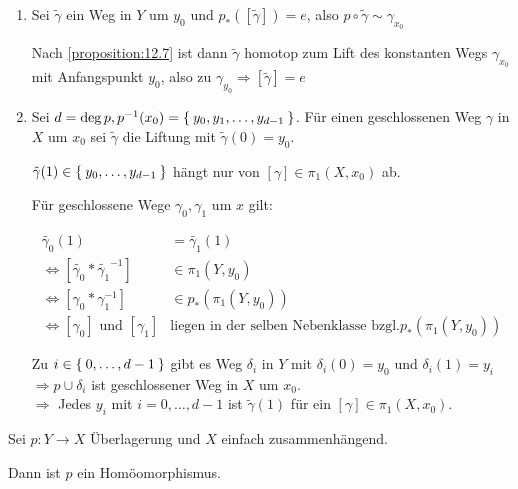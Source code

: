 \begin{beweis}\leavevmode
    \begin{enumerate}[label=\alph*)]
        \item Sei $\tilde{\gamma}$ ein Weg in $Y$ um $y_0$ und
              $p_* ([\tilde{\gamma}]) = e$, also $p \circ \tilde{\gamma} \sim \gamma_{x_0}$

              Nach \cref{proposition:12.7} ist dann 
              $\tilde{\gamma}$ homotop zum Lift des konstanten Wegs
              $\gamma_{x_0}$ mit Anfangspunkt $y_0$, also zu
              $\gamma_{y_0} \Rightarrow [\tilde{\gamma}] = e$
        \item Sei $d = \deg{p}, p^{-1}(x_0) = \Set{y_0, y_1, \dots, y_{d-1}}$.
              Für einen geschlossenen Weg $\gamma$ in $X$ um $x_0$
              sei $\tilde{\gamma}$ die Liftung mit $\tilde{\gamma}(0) = y_0$.

              $\tilde{\gamma}(1) \in \Set{y_0, \dots, y_{d-1}}$ hängt
              nur von $[\gamma] \in \pi_1(X,x_0)$ ab.

              Für geschlossene Wege $\gamma_0, \gamma_1$ um $x$ gilt:

              \begin{align*}
                \tilde{\gamma_0}(1) &= \tilde{\gamma_1}(1)\\
                \Leftrightarrow [\tilde{\gamma_0} * \tilde{\gamma_1}^{-1}] &\in \pi_1(Y, y_0)\\
                \Leftrightarrow [\gamma_0 * \gamma_1^{-1}] &\in p_* (\pi_1(Y,y_0))\\
                \Leftrightarrow [\gamma_0] \text{ und } [\gamma_1] &\text{liegen in der selben Nebenklasse bzgl.} p_*(\pi_1(Y, y_0))
              \end{align*}

              Zu $i \in \Set{0, \dots, d-1}$ gibt es Weg $\delta_i$ in
              $Y$ mit $\delta_i(0) = y_0$ und $\delta_i(1) = y_i$\\
              $\Rightarrow p \cup \delta_i$ ist geschlossener Weg in 
              $X$ um $x_0$.\\
              $\Rightarrow$ Jedes $y_i$ mit $i=0, \dots, d-1$ ist 
              $\tilde{\gamma}(1)$ für ein $[\gamma] \in \pi_1(X,x_0)$.
    \end{enumerate}
\end{beweis}

\begin{bemerkung}%
    Sei $p: Y \rightarrow X$ Überlagerung und $X$ einfach zusammenhängend.

    Dann ist $p$ ein Homöomorphismus.
\end{bemerkung}


